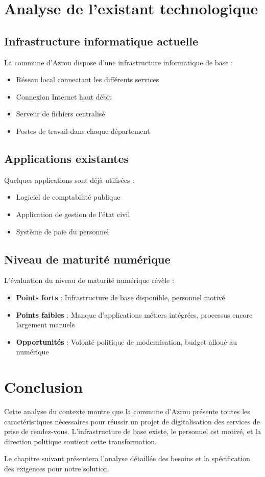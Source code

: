 \section{Analyse de l'existant technologique}

\subsection{Infrastructure informatique actuelle}

La commune d'Azrou dispose d'une infrastructure informatique de base :
\begin{itemize}
    \item Réseau local connectant les différents services
    \item Connexion Internet haut débit
    \item Serveur de fichiers centralisé
    \item Postes de travail dans chaque département
\end{itemize}

\subsection{Applications existantes}

Quelques applications sont déjà utilisées :
\begin{itemize}
    \item Logiciel de comptabilité publique
    \item Application de gestion de l'état civil
    \item Système de paie du personnel
\end{itemize}

\subsection{Niveau de maturité numérique}

L'évaluation du niveau de maturité numérique révèle :
\begin{itemize}
    \item \textbf{Points forts} : Infrastructure de base disponible, personnel motivé
    \item \textbf{Points faibles} : Manque d'applications métiers intégrées, processus encore largement manuels
    \item \textbf{Opportunités} : Volonté politique de modernisation, budget alloué au numérique
\end{itemize}

\section{Conclusion}

Cette analyse du contexte montre que la commune d'Azrou présente toutes les caractéristiques nécessaires pour réussir un projet de digitalisation des services de prise de rendez-vous. L'infrastructure de base existe, le personnel est motivé, et la direction politique soutient cette transformation.

Le chapitre suivant présentera l'analyse détaillée des besoins et la spécification des exigences pour notre solution.
